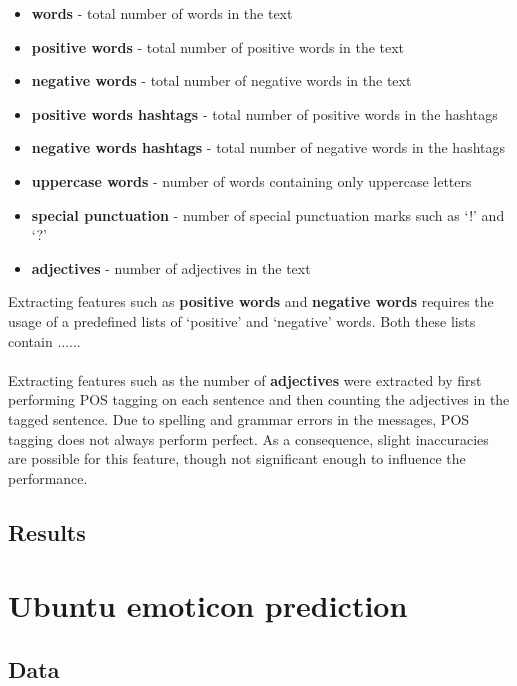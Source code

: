 \documentclass{article}
\begin{document}
\begin{itemize}
\item \textbf{words} - total number of words in the text
\item \textbf{positive words} - total number of positive words in the text
\item \textbf{negative words} - total number of negative words in the text
\item \textbf{positive words hashtags} - total number of positive words in the hashtags
\item \textbf{negative words hashtags} - total number of negative words in the hashtags
\item \textbf{uppercase words} - number of words containing only uppercase letters
\item \textbf{special punctuation} - number of special punctuation marks such as `!' and `?'
\item \textbf{adjectives} - number of adjectives in the text 
\end{itemize}

\noindent Extracting features such as \textbf{positive words} and \textbf{negative words} requires the usage of a predefined lists of `positive' and `negative' words. Both these lists contain ...... %
\\
\\
Extracting features such as the number of \textbf{adjectives} were extracted by first performing POS tagging on each sentence and then counting the adjectives in the tagged sentence. Due to spelling and grammar errors in the messages, POS tagging does not always perform  perfect. As a consequence, slight inaccuracies are possible for this feature, though not significant enough to influence the performance.


\subsection*{Results}

\pagebreak

\section*{Ubuntu emoticon prediction}

\subsection*{Data}
\end{document}
